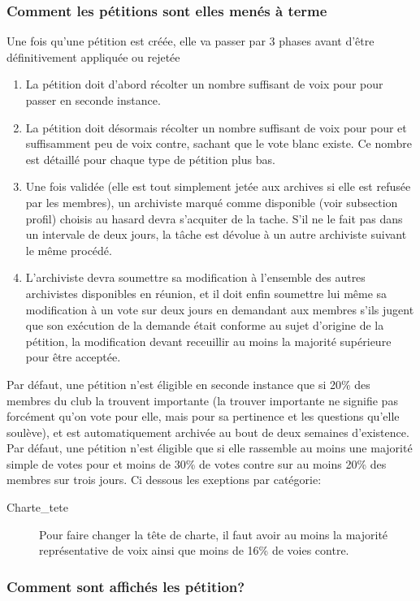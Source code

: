 \documentclass[a4paper,12pt]{article}
\begin{document}
\subsubsection{Comment les pétitions sont elles menés à terme}
Une fois qu'une pétition est créée, elle va passer par 3 phases avant d'être définitivement appliquée ou rejetée
\begin{enumerate}
 \item La pétition doit d'abord récolter un nombre suffisant de voix pour pour passer en seconde instance.
 \item La pétition doit désormais récolter un nombre suffisant de voix pour pour et suffisamment peu de voix contre, sachant que le vote blanc existe. Ce nombre est détaillé pour chaque type de pétition plus bas.
 \item Une fois validée (elle est tout simplement jetée aux archives si elle est refusée par les membres), un archiviste marqué comme disponible (voir subsection profil) choisis au hasard devra s'acquiter de la tache. S'il ne le fait pas dans un intervale de deux jours, la tâche est dévolue à un autre archiviste suivant le même procédé.
 \item L'archiviste devra soumettre sa modification à l'ensemble des autres archivistes disponibles en réunion, et il doit enfin soumettre lui même sa modification à un vote sur deux jours en demandant aux membres s'ils jugent que son exécution de la demande était conforme au sujet d'origine de la pétition, la modification devant receuillir au moins la majorité supérieure pour être acceptée.
\end{enumerate}
Par défaut, une pétition n'est éligible en seconde instance que si 20\% des membres du club la trouvent importante (la trouver importante ne signifie pas forcément qu'on vote pour elle, mais pour sa pertinence et les questions qu'elle soulève), et est automatiquement archivée au bout de deux semaines d'existence.
Par défaut, une pétition n'est éligible que si elle rassemble au moins une majorité simple de votes pour et moins de 30\% de votes contre sur au moins 20\% des membres sur trois jours. Ci dessous les exeptions par catégorie:
\begin{description}
 \item [Charte\_tete] Pour faire changer la tête de charte, il faut avoir au moins la majorité représentative de voix ainsi que moins de 16\% de voies contre.
\end{description}

\subsubsection{Comment sont affichés les pétition?}
\end{document}
